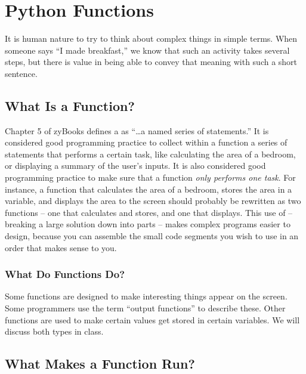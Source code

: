 
\chapter{Python Functions}
\label{day:functions1}


\minitoc

It is human nature to try to think about complex things in simple terms.  When someone says ``I made breakfast,'' we know that such an activity takes several steps, but there is value in being able to convey that meaning with such a short sentence.

\section{What Is a Function?}

Chapter 5 of zyBooks defines a  as ``\dots a named series of statements.''  It is considered good programming practice to collect within a function a series of statements that performs a certain task, like calculating the area of a bedroom, or displaying a summary of the user's inputs.  It is also considered good programming practice to make sure that a function \textit{only performs one task}.  For instance, a function that calculates the area of a bedroom, stores the area in a variable, and displays the area to the screen should probably be rewritten as two functions -- one that calculates and stores, and one that displays.  This use of  -- breaking a large solution down into parts -- makes complex programs easier to design, because you can assemble the small code segments you wish to use in an order that makes sense to you.

\subsection{What Do Functions Do?}
Some functions are designed to make interesting things appear on the screen.  Some programmers use the term ``output functions'' to describe these. Other functions are used to make certain values get stored in certain variables.  We will discuss both types in class.

\section{What Makes a Function Run?}

